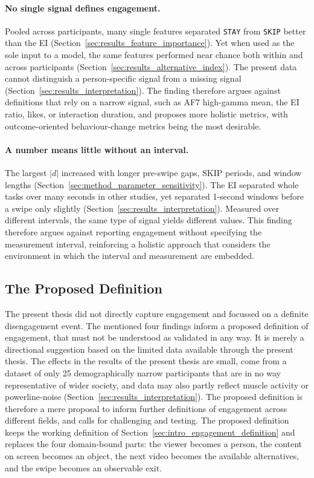 \documentclass[12pt,a4paper]{report}
\begin{document}
\paragraph{No single signal defines engagement.}
Pooled across participants, many single features separated \texttt{STAY} from \texttt{SKIP} better than the EI (Section~\ref{sec:results_feature_importance}). Yet when used as the sole input to a model, the same features performed near chance both within and across participants (Section~\ref{sec:results_alternative_index}). The present data cannot distinguish a person-specific signal from a missing signal (Section~\ref{sec:results_interpretation}). The finding therefore argues against definitions that rely on a narrow signal, such as AF7 high-gamma mean, the EI ratio, likes, or interaction duration, and proposes more holistic metrics, with outcome-oriented behaviour-change metrics being the most desirable.

\paragraph{A number means little without an interval.}
The largest \(|d|\) increased with longer pre-swipe gaps, SKIP periods, and window lengths (Section~\ref{sec:method_parameter_sensitivity}). The EI separated whole tasks over many seconds in other studies, yet separated 1-second windows before a swipe only slightly (Section~\ref{sec:results_interpretation}). Measured over different intervals, the same type of signal yields different values. This finding therefore argues against reporting engagement without specifying the measurement interval, reinforcing a holistic approach that considers the environment in which the interval and measurement are embedded.

\subsection{The Proposed Definition}
\label{sec:engagement_definition}

The present thesis did not directly capture engagement and focussed on a definite disengagement event. The mentioned four findings inform a proposed definition of engagement, that must not be understood as validated in any way. It is merely a directional suggestion based on the limited data available through the present thesis. The effects in the results of the present thesis are small, come from a dataset of only 25 demographically narrow participants that are in no way representative of wider society, and data may also partly reflect muscle activity or powerline-noise (Section~\ref{sec:results_interpretation}). The proposed definition is therefore a mere proposal to inform further definitions of engagement across different fields, and calls for challenging and testing. The proposed definition keeps the working definition of Section~\ref{sec:intro_engagement_definition} and replaces the four domain-bound parts: the viewer becomes a person, the content on screen becomes an object, the next video becomes the available alternatives, and the swipe becomes an observable exit.
\end{document}
